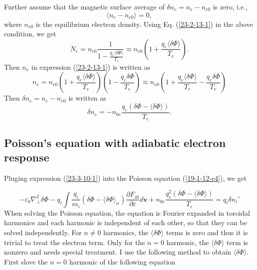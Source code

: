 \documentclass{article}
\begin{document}
Further assume that the magnetic surface average of $\delta n_e = n_e - n_{e
0}$ is zero, i.e.,
\begin{equation}
  \langle n_e - n_{e 0} \rangle = 0,
\end{equation}
where $n_{e 0}$ is the equilibrium electron density. Using Eq.
(\ref{23-2-13-1}) in the above condition, we get
\begin{equation}
  N_e = n_{e 0} \frac{1}{1 - \frac{q_e \langle \delta \Phi \rangle}{T_e}}
  \approx n_{e 0} \left( 1 + \frac{q_e \langle \delta \Phi \rangle}{T_e}
  \right) .
\end{equation}
Then $n_e$ in expression (\ref{23-2-13-1}) is written as
\begin{equation}
  n_e = n_{e 0} \left( 1 + \frac{q_e \langle \delta \Phi \rangle}{T_e} \right)
  \left( 1 - \frac{q_e \delta \Phi}{T_e} \right) \approx n_{e 0} \left( 1 +
  \frac{q_e \langle \delta \Phi \rangle}{T_e} - \frac{q_e \delta \Phi}{T_e}
  \right)
\end{equation}
Then $\delta n_e = n_e - n_{e 0}$ is written as
\begin{equation}
  \label{23-3-10-1} \delta n_e = - n_{0 e} \frac{q_e (\delta \Phi - \langle
  \delta \Phi \rangle)}{T_e} .
\end{equation}

\subsection{Poisson's equation with adiabatic electron response}

Pluging expression (\ref{23-3-10-1}) into the Poisson equation
(\ref{19-1-12-e4}), we get


\begin{equation}
  \label{23-2-13-3} - \varepsilon_0 \nabla^2_{\perp} \delta \Phi - q_i \int
  \frac{q_i}{m_i} (\delta \Phi - \langle \delta \Phi \rangle_{\alpha})
  \frac{\partial F_{i 0}}{\partial \varepsilon} d\mathbf{v}+ n_{0 e}
  \frac{q_e^2 (\delta \Phi - \langle \delta \Phi \rangle)}{T_e} = q_i \delta
  n_i'
\end{equation}
When solving the Poisson equation, the equation is Fourier expanded in
toroidal harmonics and each harmonic is independent of each other, so that
they can be solved independently. For $n \neq 0$ harmonics, the $\langle
\delta \Phi \rangle$ terms is zero and thus it is trivial to treat the
electron term. Only for the $n = 0$ harmonic, the $\langle \delta \Phi
\rangle$ term is nonzero and needs special treatment. I use the following
method to obtain $\langle \delta \Phi \rangle$. First slove the $n = 0$
harmonic of the following equation
\end{document}
